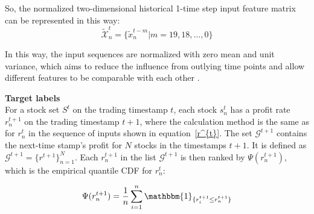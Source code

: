 \documentclass[preprint,12pt]{elsarticle}
\begin{document}
So, the normalized two-dimensional historical 1-time step input feature matrix can be represented in this way:
\begin{equation}
{\tilde{\mathcal{X}}}^{t} _{n} = \lbrace \tilde{x}^{t-m}_{n} \vert m = 19, 18, \dots, 0 \rbrace 
\label{nor:Chi_x}
\end{equation}

In this way, the input sequences are normalized with zero mean and unit variance, which aims to reduce the influence from outlying time points and allow different features to be comparable with each other \citep{klambauer2017self}.

\textbf{Target labels}\\
For a stock set $S^{t}$ on the trading timestamp $t$, each stock $s^{t}_{n}$ has a profit rate $r_{n}^{t+1}$ on the trading timestamp $t+1$, where the calculation method is the same as for $r^{t}_n$ in the sequence of inputs shown in equation~\eqref{r^{t}}. The set $\mathcal{G}^{t+1}$ contains the next-time stamp's profit for $N$ stocks in the timestamps $t+1$. It is defined as $\mathcal{G}^{t+1} = \{r^{t+1} \}^N_{n=1}$. Each $r^{t+1}_n$ in the list $\mathcal{G}^{t+1}$ is then ranked by $\Psi(r^{t+1}_n)$, which is the empirical quantile CDF for $r^t_n$:

\begin{equation}
\Psi(r^{t+1}_n) = \frac{1}{n} \sum^n_{i=1} \mathbbm{1}_{\{r^{t+1}_i \leq r^{t+1}_n \}}
\label{empirical quantile }
\end{equation}
\end{document}

